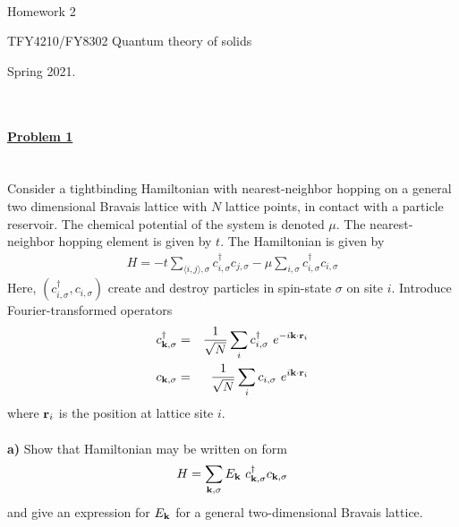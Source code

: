 \documentclass{article}
\begin{document}
\\

\centerline{\Large Homework 2}
\centerline{\Large  TFY4210/FY8302 Quantum theory of solids}
\centerline{\Large Spring 2021.}
\normalsize
\ \\
\ \\
\underline{\large\bf Problem 1 }\\
\ \\
\ \\
Consider a tightbinding Hamiltonian with nearest-neighbor hopping on a general two dimensional Bravais lattice with $N$ lattice points, in contact with a particle reservoir. The chemical potential of the system is denoted $\mu$. The nearest-neighbor hopping element is given by $t$. The Hamiltonian is given by 
\begin{eqnarray}
H = - t \sum_{\langle i,j \rangle, \sigma} c^{\dagger}_{i,\sigma} c_{j,\sigma} - \mu   \sum_{ i, \sigma} c^{\dagger}_{i,\sigma} c_{i,\sigma} \nonumber 
\end{eqnarray}
Here, $(c^{\dagger}_{i,\sigma}, c_{i,\sigma})$ create and destroy particles in spin-state $\sigma$ on site $i$. 
Introduce Fourier-transformed operators 
\begin{eqnarray}
c^{\dagger}_{{\bf k},\sigma} & = & \frac{1}{\sqrt{N}} \sum_{i} c^{\dagger}_{i,\sigma} ~ e^{-i {\bf k} \cdot {\bf r}_i} \nonumber  \\
c_{{\bf k},\sigma} & = & \frac{1}{\sqrt{N}} \sum_{i} c_{i,\sigma} ~ e^{i {\bf k} \cdot {\bf r}_i} \nonumber
\end{eqnarray}
where ${\bf r}_i$ is the position at lattice site $i$. 
\ \\
\ \\
{\bf a)} Show that Hamiltonian may be written on form
\begin{eqnarray}
H = \sum_{{\bf k}, \sigma} E_{\bf k} ~ c^{\dagger}_{{\bf k},\sigma} c_{{\bf k},\sigma}  \nonumber 
\end{eqnarray}
and give an expression for $E_{\bf k}$ for a general two-dimensional Bravais lattice. 
\ \\
\ \\
\end{document}
